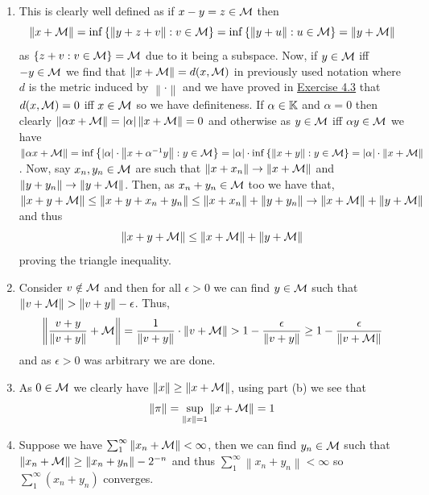 \documentclass[12pt,a4paper]{article}
\begin{document}
\begin{solution}
    \begin{enumerate}[label=\alph*.]
        \item This is clearly well defined as if $x-y=z\in\mathcal{M}$ then 
            \[
                \left\|x+\mathcal{M}\right\|=\inf \qty{ \left\|y+z+v\right\|:v\in\mathcal{M}}=\inf \qty{ \left\|y+u\right\|:u\in\mathcal{M}}= \left\|y+\mathcal{M}\right\|
            \]
            as $ \qty{z+v:v\in\mathcal{M}}=\mathcal{M}$ due to it being a subspace. 
            Now, if $y\in\mathcal{M}$ iff $-y\in\mathcal{M}$ we find that $ \left\|x+\mathcal{M}\right\|=d(x,\mathcal{M})$ in previously used notation where $d$ is the metric induced by $ \left\|\cdot\right\|$ and we have proved in \hyperref[prob:4-3]{Exercise 4.3} that $d(x,\mathcal{M})=0$ iff $x\in\mathcal{M}$ so we have definiteness. 
            If $\alpha\in\mathbb{K}$ and $\alpha=0$ then clearly $ \left\|\alpha x+\mathcal{M}\right\|=|\alpha|\left\|x+\mathcal{M}\right\|=0$ and otherwise as $y\in\mathcal{M}$ iff $\alpha y\in\mathcal{M}$ we have $\left\|\alpha x+\mathcal{M}\right\|=\inf \qty{ |\alpha|\cdot\left\|x+\alpha^{-1}y\right\|:y\in\mathcal{M}}=|\alpha|\cdot\inf \qty{ \left\|x+y\right\|:y\in\mathcal{M}}=|\alpha|\cdot \left\|x+\mathcal{M}\right\|$. 
            Now, say $x_n,y_n\in\mathcal{M}$ are such that $ \left\|x+x_n\right\|\to \left\|x+\mathcal{M}\right\|$ and $ \left\|y+y_n\right\|\to \left\|y+\mathcal{M}\right\|$. 
            Then, as $x_n+y_n\in\mathcal{M}$ too we have that, $ \left\|x+y+\mathcal{M}\right\|\leq \left\|x+y+x_n+y_n\right\|\leq \left\|x+x_n\right\|+ \left\|y+y_n\right\|\to \left\|x+\mathcal{M}\right\|+ \left\|y+\mathcal{M}\right\|$ and thus 
            \[
                \left\|x+y+\mathcal{M}\right\|\leq \left\|x+\mathcal{M}\right\| + \left\|y+\mathcal{M}\right\|
            \]
            proving the triangle inequality.
        \item Consider $v\notin\mathcal{M}$ and then for all $\epsilon>0$ we can find $y\in\mathcal{M}$ such that $ \left\|v+\mM\right\|> \left\|v+y\right\|-\epsilon$. 
            Thus, 
            \[
                \left\| \frac{v+y}{ \left\|v+y\right\|}+\mM\right\|= \frac{1}{ \left\|v+y\right\|}\cdot \left\|v+\mM\right\|>1- \frac{\epsilon}{ \left\|v+y\right\|}\geq 1- \frac{\epsilon}{ \left\|v+\mM\right\|}
            \]
            and as $\epsilon>0$ was arbitrary we are done. 
        \item As $0\in\mathcal{M}$ we clearly have $ \left\|x\right\|\geq \left\|x+\mathcal{M}\right\|$, using part (b) we see that 
            \[
                \left\|\pi\right\|=\sup_{ \left\|x\right\|=1} \left\|x+\mathcal{M}\right\|=1
            \]
        \item Suppose we have $\sum_1^\infty \left\|x_n+\mathcal{M}\right\|<\infty$, then we can find $y_n\in\mathcal{M}$ such that $ \left\|x_n+\mathcal{M}\right\|\geq \left\|x_n+y_n\right\|-2^{-n}$ and thus $\sum_1^\infty \left\|x_n+y_n\right\|<\infty$ so $\sum_1^\infty (x_n+y_n)$ converges. 

\end{enumerate}
\end{solution}
\end{document}
